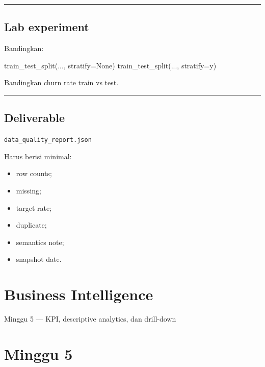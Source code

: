 \documentclass[
  indonesian,
  letterpaper,
  DIV=11,
  numbers=noendperiod]{scrreprt}
\newenvironment{Shaded}{\begin{snugshade}}{\end{snugshade}}
\newcommand{\NormalTok}[1]{\textcolor[rgb]{0.00,0.23,0.31}{#1}}
\newcommand{\OperatorTok}[1]{\textcolor[rgb]{0.37,0.37,0.37}{#1}}
\newcommand{\VariableTok}[1]{\textcolor[rgb]{0.07,0.07,0.07}{#1}}
\providecommand{\tightlist}{%
  \setlength{\itemsep}{0pt}\setlength{\parskip}{0pt}}
\begin{document}
\begin{center}\rule{0.5\linewidth}{0.5pt}\end{center}

\section{Lab experiment}\label{lab-experiment}

Bandingkan:

\begin{Shaded}
\begin{Highlighting}[]
\NormalTok{train\_test\_split(..., stratify}\OperatorTok{=}\VariableTok{None}\NormalTok{)}
\NormalTok{train\_test\_split(..., stratify}\OperatorTok{=}\NormalTok{y)}
\end{Highlighting}
\end{Shaded}

Bandingkan churn rate train vs test.

\begin{center}\rule{0.5\linewidth}{0.5pt}\end{center}

\section{Deliverable}\label{deliverable-1}

\texttt{data\_quality\_report.json}

Harus berisi minimal:

\begin{itemize}
\tightlist
\item
  row counts;
\item
  missing;
\item
  target rate;
\item
  duplicate;
\item
  semantics note;
\item
  snapshot date.
\end{itemize}

\chapter{Business Intelligence}\label{business-intelligence}

Minggu 5 --- KPI, descriptive analytics, dan drill-down

\hfill\break

\chapter{Minggu 5}\label{minggu-5}
\end{document}
